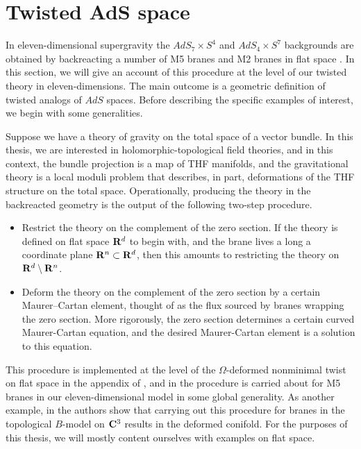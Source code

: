 \documentclass[../main.tex]{subfiles}
\begin{document}
 
\section{Twisted AdS space}
\label{sec:ads}

In eleven-dimensional supergravity the $AdS_7 \times S^4$ and $AdS_4\times S^7$ backgrounds are obtained by backreacting a number of M5 branes and M2 branes in flat space \cite{Maldacena:1997re,WittenAdS}. In this section, we will give an account of this procedure at the level of our twisted theory in eleven-dimensions. 
The main outcome is a geometric definition of twisted analogs of $AdS$ spaces. 
Before describing the specific examples of interest, we begin with some generalities.

Suppose we have a theory of gravity on the total space of a vector bundle. In this thesis, we are interested in holomorphic-topological field theories, and in this context, the bundle projection is a map of THF manifolds, and the gravitational theory is a local moduli problem that describes, in part, deformations of the THF structure on the total space. Operationally, producing the theory in the backreacted geometry is the output of the following two-step procedure. 

\begin{itemize}
  \item Restrict the theory on the complement of the zero section. 
  If the theory is defined on flat space $\mathbf{R}^d$ to begin with, and the brane lives a long a coordinate plane $\mathbf{R}^{n} \subset \mathbf{R}^d$, then this amounts to restricting the theory on $\mathbf{R}^d \setminus \mathbf{R}^n$.
  \item Deform the theory on the complement of the zero section by a certain Maurer--Cartan element, thought of as the flux sourced by branes wrapping the zero section. More rigorously, the zero section determines a certain curved Maurer-Cartan equation, and the desired Maurer-Cartan element is a solution to this equation. 
\end{itemize}

This procedure is implemented at the level of the $\Omega$-deformed nonminimal twist on flat space in the appendix of \cite{CostelloM5}, and in \cite{raghavendran2022holographic} the procedure is carried about for M5 branes in our eleven-dimensional model in some global generality. 
As another example, in \cite{CGhol} the authors show that carrying out this procedure for branes in the topological $B$-model on $\mathbf{C}^3$ results in the deformed conifold.
For the purposes of this thesis, we will mostly content ourselves with examples on flat space.
\end{document}
